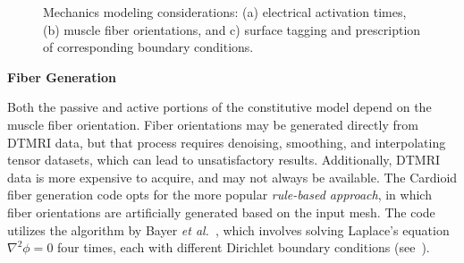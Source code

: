 \begin{figure}
{\label{fig:supp2}}
%
\caption{Mechanics modeling considerations: (a) electrical activation times, (b) muscle fiber orientations, and c) surface tagging and prescription of corresponding boundary conditions.}
\label{fig:supp}
\end{figure}

\textbf{Fiber Generation}

Both the passive and active portions of the constitutive model depend on the muscle fiber orientation. Fiber orientations may be generated directly from DTMRI data, but that process requires denoising, smoothing, and interpolating tensor datasets, which can lead to unsatisfactory results. Additionally, DTMRI data is more expensive to acquire, and may not always be available. The Cardioid fiber generation code opts for the more popular \textit{rule-based approach}, in which fiber orientations are artificially generated based on the input mesh. The code utilizes the algorithm by Bayer \textit{et al.}~\cite{bayer_2012}, which involves solving Laplace's equation $\nabla^2\phi = 0$ four times, each with different Dirichlet boundary conditions (see~).

